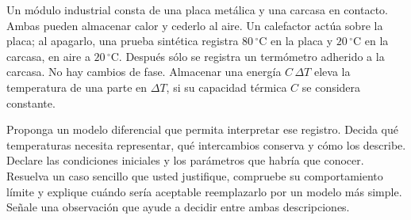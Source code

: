Un módulo industrial consta de una placa metálica y una carcasa en contacto. Ambas pueden almacenar calor y cederlo al aire. Un calefactor actúa sobre la placa; al apagarlo, una prueba sintética registra \(80\,{}^\circ\mathrm C\) en la placa y \(20\,{}^\circ\mathrm C\) en la carcasa, en aire a \(20\,{}^\circ\mathrm C\). Después sólo se registra un termómetro adherido a la carcasa. No hay cambios de fase. Almacenar una energía \(C\,\Delta T\) eleva la temperatura de una parte en \(\Delta T\), si su capacidad térmica \(C\) se considera constante.

Proponga un modelo diferencial que permita interpretar ese registro. Decida qué temperaturas necesita representar, qué intercambios conserva y cómo los describe. Declare las condiciones iniciales y los parámetros que habría que conocer. Resuelva un caso sencillo que usted justifique, compruebe su comportamiento límite y explique cuándo sería aceptable reemplazarlo por un modelo más simple. Señale una observación que ayude a decidir entre ambas descripciones.
